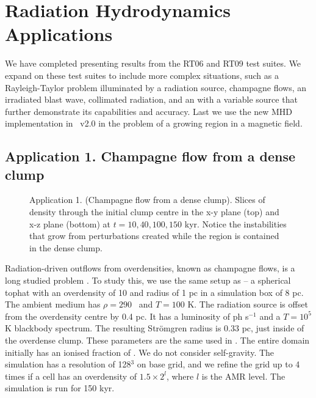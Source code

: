 \documentclass[useAMS,usenatbib]{mn2e}
\begin{document}
\section{Radiation Hydrodynamics Applications}
\label{sec:apps}

We have completed presenting results from the RT06 and RT09 test
suites.  We expand on these test suites to include more complex
situations, such as a Rayleigh-Taylor problem illuminated by a
radiation source, champagne flows, an irradiated blast wave,
collimated radiation, and an \hii with a variable source that further
demonstrate its capabilities and accuracy.  Last we use the new MHD
implementation in \enzo~v2.0 in the problem of a growing \hii region
in a magnetic field.

\subsection{Application 1. Champagne flow from a dense clump}

\begin{figure*}
  \caption{\label{fig:test8_1} Application 1. (Champagne flow from a dense
    clump).  Slices of density through the initial clump centre in the
    x-y plane (top) and x-z plane (bottom) at $t = 10, 40, 100, 150$
    kyr.  Notice the instabilities that grow from perturbations
    created while the \hii region is contained in the dense
    clump.}
\end{figure*}

Radiation-driven outflows from overdensities, known as champagne
flows, is a long studied problem \citep[e.g.][\S3.3]{Yorke86}.  To
study this, we use the same setup as \citet{Bisbas09} -- a spherical
tophat with an overdensity of 10 and radius of 1 pc in a simulation
box of 8 pc.  The ambient medium has $\rho = 290$ \cubecm~and $T =
100$ K.  The radiation source is offset from the overdensity centre by
0.4 pc.  It has a luminosity of  ph s$^{-1}$ and a $T=10^5$
K blackbody spectrum.  The resulting Str\"{o}mgren radius is 0.33 pc,
just inside of the overdense clump.  These parameters are the same
used in \citet{Bisbas09}.  The entire domain initially has an ionised
fraction of .  We do not consider self-gravity.  The
simulation has a resolution of 128$^3$ on base grid, and we refine the
grid up to 4 times if a cell has an overdensity of $1.5 \times 2^l$,
where $l$ is the AMR level.  The simulation is run for 150 kyr.
\end{document}
